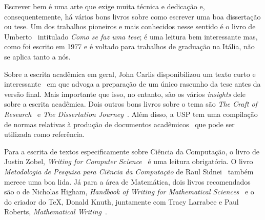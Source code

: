 

\label{cap:introducao}

\enlargethispage{.5\baselineskip}

Escrever bem é uma arte que exige muita técnica e dedicação e,
consequentemente, há vários bons livros sobre como escrever uma boa
dissertação ou tese. Um dos trabalhos pioneiros e mais conhecidos nesse
sentido é o livro de Umberto~\citet{eco:09} intitulado \emph{Como se faz
uma tese}; é uma leitura bem interessante mas, como foi escrito em 1977 e
é voltado para trabalhos de graduação na Itália, não se aplica tanto a nós.

Sobre a escrita acadêmica em geral, John Carlis disponibilizou um texto curto
e interessante~\citep{carlis:09} em que advoga a preparação de um único
rascunho da tese antes da versão final. Mais importante que isso, no
entanto, são os vários \textit{insights} dele sobre a escrita acadêmica.
Dois outros bons livros sobre o tema são \emph{The Craft of Research}~\citep{craftresearch}
e \emph{The Dissertation Journey}~\citep{dissertjourney}. Além disso,
a USP tem uma compilação de normas relativas à produção de documentos
acadêmicos~\citep{usp:guidelines} que pode ser utilizada como referência.

Para a escrita de textos especificamente sobre Ciência da Computação, o
livro de Justin Zobel, \emph{Writing for Computer Science}~\citep{zobel:04}
é uma leitura obrigatória. O livro \emph{Metodologia de Pesquisa para
Ciência da Computação} de Raul Sidnei~\citet{waz:09}
também merece uma boa lida. Já para a área de Matemática, dois livros
recomendados são o de Nicholas Higham, \emph{Handbook of Writing for
Mathematical Sciences}~\citep{Higham:98} e o do criador do \TeX{}, Donald
Knuth, juntamente com Tracy Larrabee e Paul Roberts, \emph{Mathematical
Writing}~\citep{Knuth:96}.

